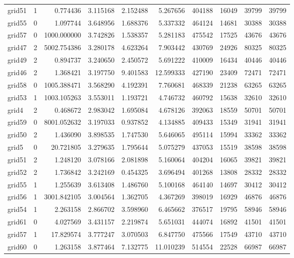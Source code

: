 \documentclass[../../../thesis.tex]{subfiles}
\begin{document}
\begin{longtable}{|l|r|r|r|r|r|r|r|r|r|}
grid51 & 1 & 0.774436 & 3.115168 & 2.152488 & 5.267656 & 404188 & 16049 & 39799 & 39799 \\
grid55 & 0 & 1.097744 & 3.648956 & 1.688376 & 5.337332 & 464124 & 14681 & 30388 & 30388 \\
grid57 & 0 & 1000.000000 & 3.742826 & 1.538357 & 5.281183 & 475542 & 17525 & 43676 & 43676 \\
grid47 & 2 & 5002.754386 & 3.280178 & 4.623264 & 7.903442 & 430769 & 24926 & 80325 & 80325 \\
grid49 & 2 & 0.894737 & 3.240650 & 2.450572 & 5.691222 & 410009 & 16434 & 40446 & 40446 \\
grid46 & 2 & 1.368421 & 3.197750 & 9.401583 & 12.599333 & 427190 & 23409 & 72471 & 72471 \\
grid58 & 0 & 1005.388471 & 3.568290 & 4.192391 & 7.760681 & 468339 & 21238 & 63265 & 63265 \\
grid53 & 1 & 1003.105263 & 3.553011 & 1.193721 & 4.746732 & 460792 & 15638 & 32610 & 32610 \\
grid4 & 2 & 0.468672 & 2.983042 & 1.695084 & 4.678126 & 392063 & 18559 & 50701 & 50701 \\
grid59 & 0 & 8001.052632 & 3.197033 & 0.937852 & 4.134885 & 409433 & 15349 & 31941 & 31941 \\
grid50 & 2 & 1.436090 & 3.898535 & 1.747530 & 5.646065 & 495114 & 15994 & 33362 & 33362 \\
grid5 & 0 & 20.721805 & 3.279635 & 1.795644 & 5.075279 & 437053 & 15519 & 38598 & 38598 \\
grid51 & 2 & 1.248120 & 3.078166 & 2.081898 & 5.160064 & 404204 & 16065 & 39821 & 39821 \\
grid52 & 2 & 1.736842 & 3.242169 & 0.454325 & 3.696494 & 401268 & 13808 & 28332 & 28332 \\
grid55 & 1 & 1.255639 & 3.613408 & 1.486760 & 5.100168 & 464140 & 14697 & 30412 & 30412 \\
grid56 & 1 & 3001.842105 & 3.004564 & 1.362705 & 4.367269 & 398019 & 16929 & 46876 & 46876 \\
grid54 & 1 & 2.263158 & 2.866702 & 3.598960 & 6.465662 & 376517 & 19795 & 58946 & 58946 \\
grid61 & 0 & 4.027569 & 3.431157 & 2.219874 & 5.651031 & 444074 & 16892 & 41501 & 41501 \\
grid57 & 1 & 17.829574 & 3.777247 & 3.070503 & 6.847750 & 475566 & 17549 & 43710 & 43710 \\
grid60 & 0 & 1.263158 & 3.877464 & 7.132775 & 11.010239 & 514554 & 22528 & 66987 & 66987 \\

\end{longtable}
\end{document}
